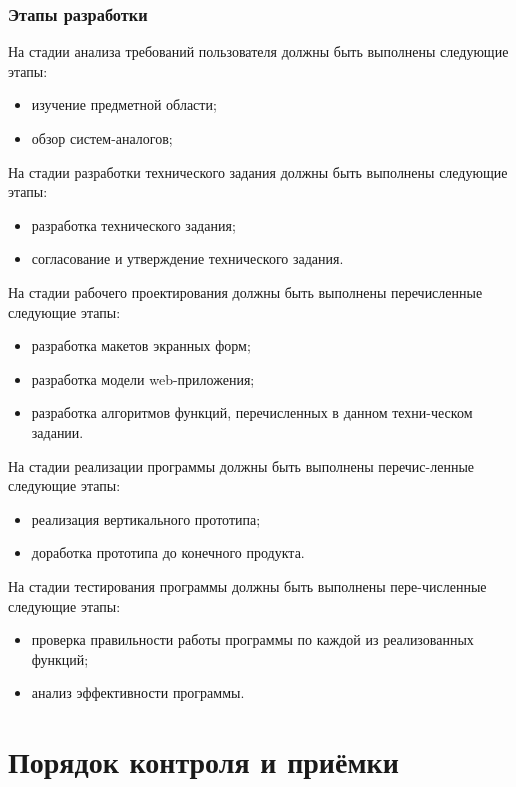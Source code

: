 \documentclass[14pt]{extarticle}        %
\begin{document}
\subsubsection{Этапы разработки}
На стадии анализа требований пользователя должны быть выполнены следующие этапы:
\begin{itemize}
    \item изучение предметной области;
    \item обзор систем-аналогов;
\end{itemize}\par
На стадии разработки технического задания должны быть выполнены следующие этапы:
\begin{itemize}
    \item разработка технического задания;
    \item согласование и утверждение технического задания.
\end{itemize}\par
На стадии рабочего проектирования должны быть выполнены перечисленные следующие этапы:
\begin{itemize}
    \item разработка макетов экранных форм;
    \item разработка модели web-приложения;
    \item разработка алгоритмов функций, перечисленных в данном техни-ческом задании.
\end{itemize}\par
На стадии реализации программы должны быть выполнены перечис-ленные следующие этапы:
\begin{itemize}
    \item реализация вертикального прототипа;
    \item доработка прототипа до конечного продукта.
\end{itemize}\par
На стадии тестирования программы должны быть выполнены пере-численные следующие этапы:
\begin{itemize}
    \item проверка правильности работы программы по каждой из реализованных функций;
    \item анализ эффективности программы.
\end{itemize}

\newpage

\section {Порядок контроля и приёмки}
\end{document}
